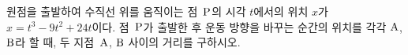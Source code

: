원점을 출발하여 수직선 위를 움직이는 점~$\mathrm{P}$의 시각 $t$에서의 위치 $x$가 $x=t^3-9t^2+24t$이다. 점~$\mathrm{P}$가 출발한 후 운동 방향을 바꾸는 순간의 위치를 각각 $\mathrm{A}$, $\mathrm{B}$라 할 때, 두 지점~$\mathrm{A}$, $\mathrm{B}$ 사이의 거리를 구하시오.
